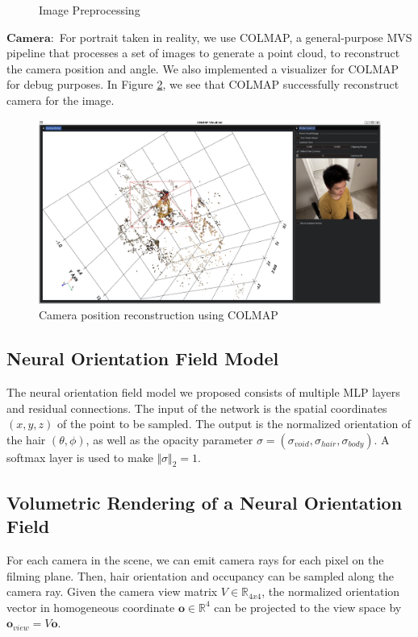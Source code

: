 \documentclass[12pt]{article}
\begin{document}
\begin{figure}[h]
        \caption{Image Preprocessing}
        \label{fig:image_prep}
    \end{figure}

    $\mathbf{Camera:}$ For portrait taken in reality, we use COLMAP, a general-purpose MVS pipeline that processes a set of images to generate a point cloud, to reconstruct the camera position and angle. We also implemented a visualizer for COLMAP for debug purposes. In Figure \ref{fig:colmap_demo}, we see that COLMAP successfully reconstruct camera for the image.
    \begin{figure}[h]
        \centering
        \includegraphics[width=0.5\linewidth]{project-milestone/images/colmap_demo.png}
        \caption{Camera position reconstruction using COLMAP}
        \label{fig:colmap_demo}
    \end{figure}

    \subsection{Neural Orientation Field Model}
    
    The neural orientation field model we proposed consists of multiple MLP layers and residual connections. The input of the network is the spatial coordinates $(x, y, z)$ of the point to be sampled. The output is the normalized orientation of the hair $(\theta, \phi)$, as well as the opacity parameter $\sigma = (\sigma_{void}, \sigma_{hair}, \sigma_{body})$. A softmax layer is used to make $\Vert \sigma \Vert_{2} = 1$.

    \subsection{Volumetric Rendering of a Neural Orientation Field}

    For each camera in the scene, we can emit camera rays for each pixel on the filming plane. Then, hair orientation and occupancy can be sampled along the camera ray. Given the camera view matrix $V \in \mathbb{R}_{4x4}$, the normalized orientation vector in homogeneous coordinate $\mathbf{o} \in \mathbb{R}^{4}$ can be projected to the view space by $\mathbf{o}_{view} = V\mathbf{o}$.
\end{document}
